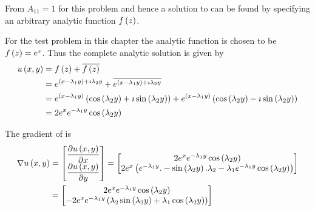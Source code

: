 From \citet{clements:1981} $A_{11}=1$ for this problem and hence a
solution to  can be found by specifying an
arbitrary analytic function $ f\left( z \right) $.

For the test problem in this chapter the analytic function is chosen to be
$ f\left( z \right) =e^{z}$. Thus the complete analytic solution is given by
\begin{equation}
  \begin{split}
    \fnof{u}{x,y}&=\fnof{f}{z}+\overline{\fnof{f}{z}} \\
    &= e^{\pbrac{x-\lambda_{1}y}+\imath\lambda_{2}y}+
    \overline{e^{\pbrac{x-\lambda_{1}y}+\imath\lambda_{2}y}} \\
    &= e^{\pbrac{x-\lambda_{1}y}}\pbrac{\cosine{\lambda_{2}y}+\imath
      \sine{\lambda_{2}y}}+e^{\pbrac{x-\lambda_{1}y}}
    \pbrac{\cosine{\lambda_{2}y}-\imath\sine{\lambda_{2}y}} \\
    &= 2e^{x}e^{-\lambda_{1}{y}}\cosine{\lambda_{2}y}
  \end{split}
  \label{eqn:GeneralisedLaplaceTwoDAnalytic1}
\end{equation}


The gradient of  is
\begin{equation}
  \begin{aligned}
    \gradient{}{\fnof{u}{x,y}}&=\begin{bmatrix}
    \delby{\fnof{u}{x,y}}{x} \\
    \delby{\fnof{u}{x,y}}{y}
    \end{bmatrix}=\begin{bmatrix}
    2e^{x}e^{-\lambda_{1}{y}}\cosine{\lambda_{2}y} \\
    2e^{x}\pbrac{e^{-\lambda_{1}{y}}.-\sine{\lambda_{2}y}.\lambda_{2}-\lambda_{1}e^{-\lambda_{1}{y}}\cosine{\lambda_{2}y}}
    \end{bmatrix} \\
    &=\begin{bmatrix}
    2e^{x}e^{-\lambda_{1}{y}}\cosine{\lambda_{2}y} \\
    -2e^{x}e^{-\lambda_{1}{y}}\pbrac{\lambda_{2}\sine{\lambda_{2}y}+\lambda_{1}\cosine{\lambda_{2}y}}
    \end{bmatrix}
  \end{aligned}
  \label{eqn:GeneralisedLaplaceTwoDAnalyticGradient1}
\end{equation}

